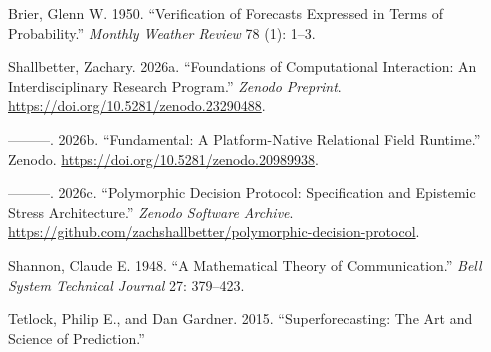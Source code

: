 \documentclass[
]{article}
\newlength{\cslhangindent}
\newenvironment{CSLReferences}[2] %
 {\begin{list}{}{%
  \setlength{\itemindent}{0pt}
  \setlength{\leftmargin}{0pt}
  \setlength{\parsep}{0pt}
  \ifodd #1
   \setlength{\leftmargin}{\cslhangindent}
   \setlength{\itemindent}{-1\cslhangindent}
  \fi
  \setlength{\itemsep}{#2\baselineskip}}}
 {\end{list}}
\begin{document}
\label{refs}
\begin{CSLReferences}{1}{0}
Brier, Glenn W. 1950. {``Verification of Forecasts Expressed in Terms of
Probability.''} \emph{Monthly Weather Review} 78 (1): 1--3.

Shallbetter, Zachary. 2026a. {``Foundations of Computational
Interaction: An Interdisciplinary Research Program.''} \emph{Zenodo
Preprint}. \url{https://doi.org/10.5281/zenodo.23290488}.

---------. 2026b. {``Fundamental: A Platform-Native Relational Field
Runtime.''} Zenodo. \url{https://doi.org/10.5281/zenodo.20989938}.

---------. 2026c. {``Polymorphic Decision Protocol: Specification and
Epistemic Stress Architecture.''} \emph{Zenodo Software Archive}.
\url{https://github.com/zachshallbetter/polymorphic-decision-protocol}.

Shannon, Claude E. 1948. {``A Mathematical Theory of Communication.''}
\emph{Bell System Technical Journal} 27: 379--423.

Tetlock, Philip E., and Dan Gardner. 2015. {``Superforecasting: The Art
and Science of Prediction.''}

\end{CSLReferences}
\end{document}
